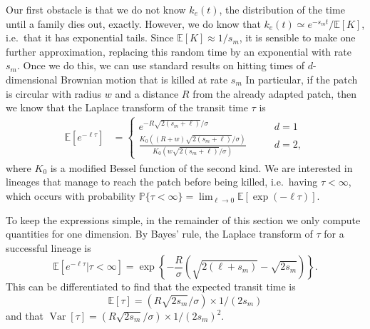 \documentclass{article}
\DeclareMathOperator{\var}{Var}
\renewcommand{\P}{\mathbb{P}}
\newcommand{\E}{\mathbb{E}}
\newcommand{\plr}[1]{{\it\color{blue}(#1)}}
\begin{document}
Our first obstacle is that we do not know $k_e(t)$, 
the distribution of the time until a family dies out, exactly.
However, we do know that $k_e(t) \simeq e^{-s_m t} / \E[K]$,
i.e.\ that it has exponential tails.
Since $\E[K] \approx 1/s_m$, it is sensible to make one further approximation,
replacing this random time by an exponential with rate $s_m$.
Once we do this, 
we can use standard results on hitting times of $d$-dimensional Brownian motion
that is killed at rate $s_m$ \citet[][(2.2.0.1 and 4.2.0.1)]{borodin2002handbook} 
In particular, if the patch is circular with radius $w$ and a distance
$R$ from the already adapted patch, then 
we know that the Laplace transform of the transit time $\tau$ is
\begin{align}
  \E[e^{-\ell \tau}] &=
    \begin{cases}
      e^{- R \sqrt{2(s_m+\ell)}/\sigma} \qquad & d=1 \\
      \frac{ K_0( (R+w)\sqrt{2(s_m+\ell)}/\sigma) }{ K_0( w\sqrt{2(s_m+\ell)}/\sigma) } \qquad & d=2  ,
    \end{cases} \label{eqn:borodinresult}
\end{align}
where $K_0$ is a modified Bessel function of the second kind.
We are interested in lineages that manage to reach the patch before being killed,
i.e.\ having $\tau < \infty$,
which occurs with probability
$\P\{\tau < \infty\} = \lim_{\ell \to 0} \E \left[\exp(-\ell \tau) \right]$. 

To keep the expressions simple, in the remainder of this section we only compute quantities for one dimension.
By Bayes' rule, the Laplace transform of $\tau$ for a successful lineage is
\begin{equation} \label{eqn:haplen_cdf}
\E[e^{-\ell \tau}|\tau<\infty]  = \exp\left\{{-\frac{R}{\sigma}\left(\sqrt{2(\ell+s_m)} - \sqrt{2s_m}\right)}\right\} .
\end{equation}
This can be differentiated to find that the expected transit time is
\begin{equation} 
  \E[\tau] = (R\sqrt{2s_m}/\sigma)\times 1/(2s_m) \label{eqn:mean_tau}
\end{equation}
and that $\var[\tau] = (R\sqrt{2s_m}/\sigma) \times 1/(2s_m)^2$.


\end{document}
